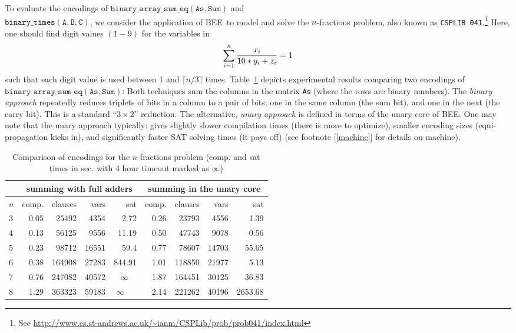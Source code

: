 \documentclass[runningheads,a4paper]{llncs}
\newcommand{\bee}{\textsf{BEE}}
\begin{document}
To evaluate the encodings of $\mathtt{binary\_array\_sum\_eq(As,Sum)}$
and \\ $\mathtt{binary\_times(A,B,C)}$, we consider the application of
\bee\ to model and solve the $n$-fractions problem, also known as
\texttt{CSPLIB 041}.\footnote{See
  \url{http://www.cs.st-andrews.ac.uk/~ianm/CSPLib/prob/prob041/index.html}}
Here, one should find digit values $(1-9)$ for the variables in
\[\sum_{i=1}^n {{x_i}\over{10*y_i+z_i}}=1\] such that each digit value
is used between 1  and $\lceil{n/3}\rceil$ times. 
Table~\ref{tab:fractions} depicts experimental results comparing two
encodings of $\mathtt{binary\_array\_sum\_eq(As,Sum)}$: Both
techniques sum the columns in the matrix \texttt{As} (where the rows
are binary numbers). The \emph{binary approach} repeatedly reduces
triplets of bits in a column to a pair of bits: one in the same column
(the sum bit), and one in the next (the carry bit). This is a standard
``$3\times 2$'' reduction. The alternative, \emph{unary approach} is
defined in terms of the unary core of \bee.
One may note that the unary approach typically: gives slightly slower
compilation times (there is more to optimize), smaller encoding sizes
(equi-propagation kicks in), and significantly faster SAT solving
times (it pays off) (see footnote [\ref{machine}] for details on
machine).


\begin{table}[t]\small
  \centering
  \begin{tabular}{|l|rrrr|rrrr|}
\hline
           & \multicolumn{4}{c|}{summing with full adders} 
           & \multicolumn{4}{c|}{summing in the unary core}\\
\hline
 $n$      &comp.&clauses&vars&sat&comp.&clauses&vars&sat\\
\hline
  3 & 0.05&25492 & 4354&2.72   & 0.26&23793 &4556 &1.39\\
  4 & 0.13&56125 & 9556&11.19  & 0.50&47743 &9078 &0.56\\
  5 & 0.23&98712 &16551&59.4   & 0.77&78607 &14703&55.65\\
  6 & 0.38&164908&27283&844.91 & 1.01&118850&21977&5.13\\
  7 & 0.76&247082&40572&$\infty$~~ & 1.87&164451&30125&36.83\\
  8 & 1.29&363323&59183&$\infty$~~~& 2.14&221262&40196&2653.68\\
\hline
\end{tabular}

\caption{Comparison of encodings for the $n$-fractions problem
  (comp. and sat times in sec. with 4 hour timeout marked as $\infty$)}
\label{tab:fractions}
\end{table}
\end{document}
